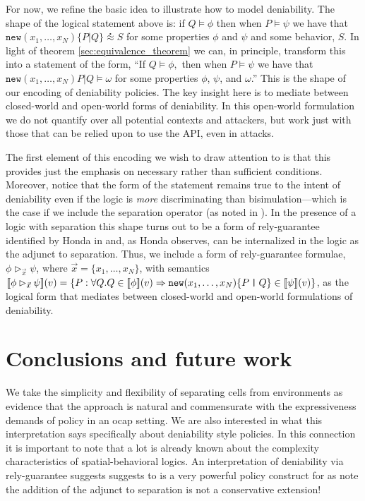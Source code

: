 \documentclass[submission,copyright,creativecommons]{eptcs}
\newcommand{\ldb}{[\![}
\newcommand{\rdb}{]\!]}
\newcommand{\id}[1]{\texttt{#1}}
\newcommand{\juxtap}{\mathbin{\id{|}}}
\newcommand{\binpar}[2]{#1 \juxtap #2}
\newcommand{\pmeaningof}[1]{\ldb #1 \rdb}
\newcommand{\wbbisim}{\stackrel{\centerdot}{\approx}} %
\numberwithin{equation}{subsection}
\begin{document}
For now, we refine the basic idea to illustrate how to model
deniability. The shape of the logical statement above is: if $Q
\models \phi$ then when $P \models \psi$ we have that
$\texttt{new}(x_1,\ldots,x_N)\{ \binpar{P}{Q} \} \wbbisim S$ for some
properties $\phi$ and $\psi$ and some behavior, $S$. In light of
theorem \ref{sec:equivalence_theorem} we can, in principle, transform
this into a statement of the form, ``If $Q \models \phi,$ then when $P
\models \psi$ we have that $\texttt{new}(x_1,\ldots,x_N)\binpar{P}{Q}
\models \omega$ for some properties $\phi$, $\psi$, and $\omega$.'' This
is the shape of our encoding of deniability policies. The key insight
here is to mediate between closed-world and open-world forms of
deniability. In this open-world formulation we do not quantify over
all potential contexts and attackers, but work just with those that
can be relied upon to use the API, even in attacks.

The first element of this encoding we wish to draw attention to is
that this provides just the emphasis on necessary rather than
sufficient conditions. Moreover, notice that the form of the statement
remains true to the intent of deniability even if the logic is
\emph{more} discriminating than bisimulation---which is the case if we
include the separation operator (as noted in
\cite{DBLP:conf/fossacs/Caires04}). In the presence of a logic with
separation this shape turns out to be a form of rely-guarantee
identified by Honda in \cite{Honda:2008:UTP:2227536.2227558} and, as
Honda observes, can be internalized in the logic as the adjunct to
separation. Thus, we include a form of rely-guarantee formulae, $\phi
\rhd_{\vec{x}} \psi$, where $\vec{x} = \{ x_1,\ldots,x_N\}$, with
semantics $\pmeaningof{\phi \rhd_{\vec{x}} \psi}( v ) = \{ P : \forall
Q. Q \in \pmeaningof{\phi}( v ) \Rightarrow
\mbox{\texttt{new}}(x_1,\ldots,x_N)\mbox{\{}\binpar{P}{Q}\mbox{\}}\in
\pmeaningof{\psi}(v) \}$, as the logical form that mediates between
closed-world and open-world formulations of deniability.

\section{Conclusions and future work}

We take the simplicity and flexibility of separating cells from
environments as evidence that the approach is natural and commensurate
with the expressiveness demands of policy in an ocap setting. We are
also interested in what this interpretation says specifically about
deniability style policies. In this connection it is important to note
that a lot is already known about the complexity characteristics of
spatial-behavioral logics. An interpretation of deniability via
rely-guarantee suggests suggests to is a very powerful policy
construct for as \cite{Caires04eliminationof} note the addition
of the adjunct to separation is not a conservative extension!
\end{document}
